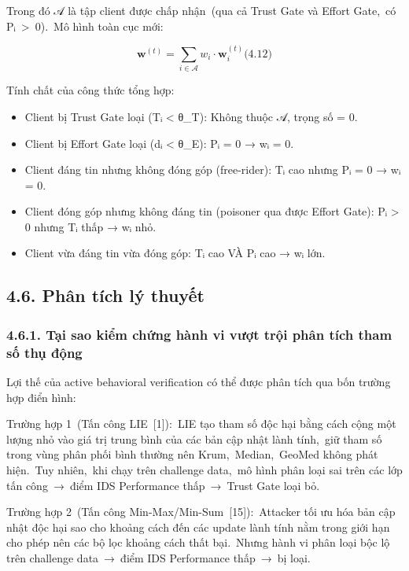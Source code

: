 Trong đó 𝒜 là tập client được chấp nhận~(qua cả Trust Gate và Effort Gate,~có Pᵢ~\textgreater~0).~Mô hình toàn cục mới:

\[\mathbf{w}^{(t)} = \sum_{i \in \mathcal{A}}^{}w_{i} \cdot \mathbf{w}_{i}^{(t)}\text{(4.12)}
\]

Tính chất của công thức tổng hợp:

\begin{itemize}
\item
  Client bị Trust Gate loại (Tᵢ \textless{} θ\_T): Không thuộc 𝒜, trọng số = 0.
\item
  Client bị Effort Gate loại (dᵢ \textless{} θ\_E): Pᵢ = 0 → wᵢ = 0.
\item
  Client đáng tin nhưng không đóng góp (free-rider): Tᵢ cao nhưng Pᵢ = 0 → wᵢ = 0.
\item
  Client đóng góp nhưng không đáng tin (poisoner qua được Effort Gate): Pᵢ \textgreater{} 0 nhưng Tᵢ thấp → wᵢ nhỏ.
\item
  Client vừa đáng tin vừa đóng góp: Tᵢ cao VÀ Pᵢ cao → wᵢ lớn.
\end{itemize}

\subsection{4.6. Phân tích lý thuyết}\label{phuxe2n-tuxedch-luxfd-thuyux1ebft}

\subsubsection{4.6.1. Tại sao kiểm chứng hành vi vượt trội phân tích tham số thụ động}\label{tux1ea1i-sao-kiux1ec3m-chux1ee9ng-huxe0nh-vi-vux1b0ux1ee3t-trux1ed9i-phuxe2n-tuxedch-tham-sux1ed1-thux1ee5-ux111ux1ed9ng}

Lợi thế của active behavioral verification có thể được phân tích qua bốn trường hợp điển hình:

Trường hợp 1~(Tấn công LIE~{[}1{]}):~LIE tạo tham số độc hại bằng cách cộng một lượng nhỏ vào giá trị trung bình của các bản cập nhật lành tính,~giữ tham số trong vùng phân phối bình thường nên Krum,~Median,~GeoMed không phát hiện.~Tuy nhiên,~khi chạy trên challenge data,~mô hình phân loại sai trên các lớp tấn công~→~điểm IDS Performance thấp~→~Trust Gate loại bỏ.

Trường hợp 2~(Tấn công Min-Max/Min-Sum~{[}15{]}):~Attacker tối ưu hóa bản cập nhật độc hại sao cho khoảng cách đến các update lành tính nằm trong giới hạn cho phép nên các bộ lọc khoảng cách thất bại.~Nhưng hành vi phân loại bộc lộ trên challenge data~→~điểm IDS Performance thấp~→~bị loại.

